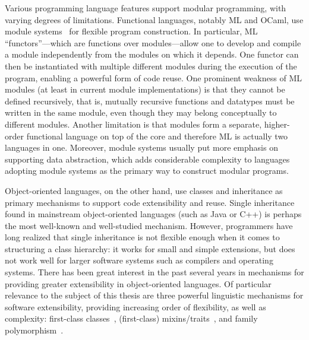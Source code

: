 Various programming language features support modular programming, with varying
degrees of limitations. Functional languages, notably ML and OCaml, use module
systems~\citep{MacQueen_1984} for flexible program construction. In particular,
ML ``functors''---which are functions over modules---allow
one to develop and compile a module independently from the modules on which it
depends. One functor can then be instantiated with multiple different modules
during the execution of the program, enabling a powerful form of code reuse. One
prominent weakness of ML modules (at least in current module implementations) is
that they cannot be defined recursively, that is, mutually recursive functions
and datatypes must be written in the same module, even though they may belong
conceptually to different modules. Another limitation is that modules form a
separate, higher-order functional language on top of the core and therefore ML
is actually two languages in one. Moreover, module systems usually put more
emphasis on supporting data abstraction, which adds considerable complexity to
languages adopting module systems as the primary way to construct modular
programs.

Object-oriented languages, on the other hand, use classes and inheritance as primary
mechanisms to support code extensibility and reuse. Single inheritance found in
mainstream object-oriented languages (such as Java or C++) is perhaps the most
well-known and well-studied mechanism. However, programmers have long realized
that single inheritance is not flexible enough when it comes to structuring a
class hierarchy: it works for small and simple extensions, but does not work
well for larger software systems such as compilers and operating systems. There
has been great interest in the past several years in mechanisms for providing
greater extensibility in object-oriented languages. Of particular relevance to
the subject of this thesis are three powerful linguistic mechanisms for software
extensibility, providing increasing order of flexibility, as well as complexity:
first-class classes~\citep{DBLP:conf/oopsla/TakikawaSDTF12}, (first-class)
mixins/traits~\citep{bracha1990mixin, scharli2003traits}, and family
polymorphism~\citep{Ernst_2001}.


